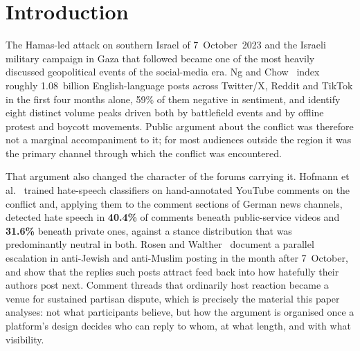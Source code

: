 \documentclass[pdflatex,sn-basic,Numbered,iicol]{sn-jnl}
\begin{document}

\maketitle

\clearpage


\section{Introduction}
The Hamas-led attack on southern Israel of 7~October~2023 and the Israeli military
campaign in Gaza that followed became one of the most heavily discussed
geopolitical events of the social-media era. Ng and Chow~\cite{ngchow2025} index
roughly 1.08~billion English-language posts across Twitter/X, Reddit and TikTok in
the first four months alone, 59\% of them negative in sentiment, and identify eight
distinct volume peaks driven both by battlefield events and by offline protest and
boycott movements. Public argument about the conflict was therefore not a marginal
accompaniment to it; for most audiences outside the region it was the primary
channel through which the conflict was encountered.

That argument also changed the character of the forums carrying it. Hofmann
et al.~\cite{hofmann2026} trained hate-speech classifiers on hand-annotated YouTube
comments on the conflict and, applying them to the comment sections of German news
channels, detected hate speech in \textbf{40.4\%} of comments beneath public-service
videos and \textbf{31.6\%} beneath private ones, against a stance distribution that
was predominantly neutral in both. Rosen and Walther~\cite{rosen2025} document a
parallel escalation in anti-Jewish and anti-Muslim posting in the month after
7~October, and show that the replies such posts attract feed back into how
hatefully their authors post next.
Comment threads that ordinarily host reaction became a venue for
sustained partisan dispute, which is precisely the material this paper analyses:
not what participants believe, but how the argument is organised once a platform's
design decides who can reply to whom, at what length, and with what visibility.
\end{document}

